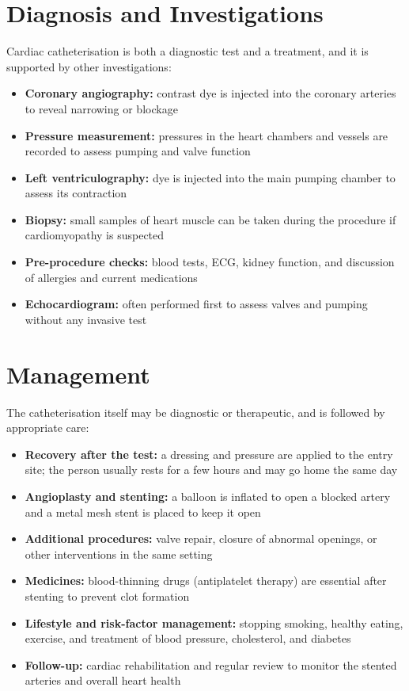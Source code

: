 \section*{Diagnosis and Investigations}
Cardiac catheterisation is both a diagnostic test and a treatment, and it is supported by other investigations:
\begin{itemize}
    \item \textbf{Coronary angiography:} contrast dye is injected into the coronary arteries to reveal narrowing or blockage
    \item \textbf{Pressure measurement:} pressures in the heart chambers and vessels are recorded to assess pumping and valve function
    \item \textbf{Left ventriculography:} dye is injected into the main pumping chamber to assess its contraction
    \item \textbf{Biopsy:} small samples of heart muscle can be taken during the procedure if cardiomyopathy is suspected
    \item \textbf{Pre-procedure checks:} blood tests, ECG, kidney function, and discussion of allergies and current medications
    \item \textbf{Echocardiogram:} often performed first to assess valves and pumping without any invasive test
\end{itemize}

\section*{Management}
The catheterisation itself may be diagnostic or therapeutic, and is followed by appropriate care:
\begin{itemize}
    \item \textbf{Recovery after the test:} a dressing and pressure are applied to the entry site; the person usually rests for a few hours and may go home the same day
    \item \textbf{Angioplasty and stenting:} a balloon is inflated to open a blocked artery and a metal mesh stent is placed to keep it open
    \item \textbf{Additional procedures:} valve repair, closure of abnormal openings, or other interventions in the same setting
    \item \textbf{Medicines:} blood-thinning drugs (antiplatelet therapy) are essential after stenting to prevent clot formation
    \item \textbf{Lifestyle and risk-factor management:} stopping smoking, healthy eating, exercise, and treatment of blood pressure, cholesterol, and diabetes
    \item \textbf{Follow-up:} cardiac rehabilitation and regular review to monitor the stented arteries and overall heart health
\end{itemize}

